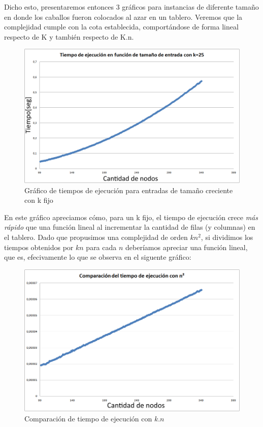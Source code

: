 \documentclass[11pt, a4paper, twoside]{article}
\begin{document}
Dicho esto, presentaremos entonces 3 gráficos para instancias de diferente tamaño en donde los caballos fueron colocados al azar en un tablero. Veremos que la complejidad cumple con la cota establecida, comportándose de forma lineal respecto de K y también respecto de K.n. 

\begin{figure}[H]
\centering
\includegraphics[scale=0.4]{imagenes/orig.jpg}
\caption{Gráfico de tiempos de ejecución para entradas de tamaño creciente con k fijo}
\end{figure} 

En este gráfico apreciamos cómo, para un k fijo, el tiempo de ejecución crece \textit{más rápido} que una función lineal al incrementar la cantidad de filas (y columnas) en el tablero. Dado que propusimos una complejidad de orden $kn^2$, si dividimos los tiempos obtenidos por $kn$ para cada $n$ deberíamos apreciar una función lineal, que es, efecivamente lo que se observa en el siguente gráfico:


\begin{figure}[H]
\centering
\includegraphics[scale=0.4]{imagenes/n2.jpg}
\caption{Comparación de tiempo de ejecución con $k.n$}
\end{figure} 
\end{document}
